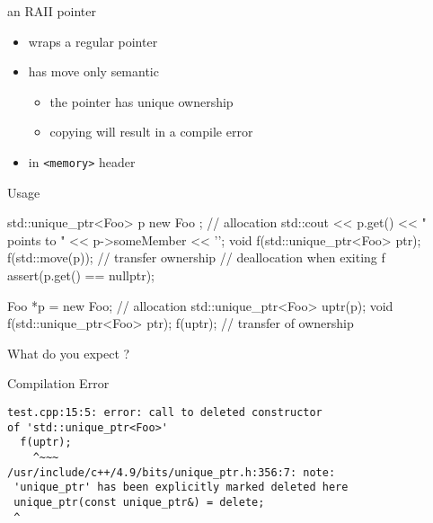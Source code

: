 \begin{frame}[fragile]
  \begin{block}{an RAII pointer}
    \begin{itemize}
    \item wraps a regular pointer
    \item has move only semantic
      \begin{itemize}
      \item the pointer has unique ownership
      \item copying will result in a compile error
      \end{itemize}
    \item in \texttt{<memory>} header
    \end{itemize}
  \end{block}
  \pause
  \begin{exampleblock}{Usage}
    \begin{cppcode*}{}
      std::unique_ptr<Foo> p{ new Foo{} }; // allocation
      std::cout << p.get() << " points to "
                << p->someMember << '\n';
      void f(std::unique_ptr<Foo> ptr);
      f(std::move(p)); // transfer ownership
      // deallocation when exiting f
      assert(p.get() == nullptr);
    \end{cppcode*}
  \end{exampleblock}
\end{frame}

\begin{frame}[fragile]
  \begin{exampleblock}{}
    \begin{cppcode*}{}
      Foo *p = new Foo{};  // allocation
      std::unique_ptr<Foo> uptr(p);
      void f(std::unique_ptr<Foo> ptr);
      f(uptr); // transfer of ownership
    \end{cppcode*}
    What do you expect ?
  \end{exampleblock}
  \pause
  \begin{alertblock}{Compilation Error}
    \begin{verbatim}
test.cpp:15:5: error: call to deleted constructor
of 'std::unique_ptr<Foo>'
  f(uptr);
    ^~~~
/usr/include/c++/4.9/bits/unique_ptr.h:356:7: note:
 'unique_ptr' has been explicitly marked deleted here
 unique_ptr(const unique_ptr&) = delete;
 ^
    \end{verbatim}
  \end{alertblock}
\end{frame}

